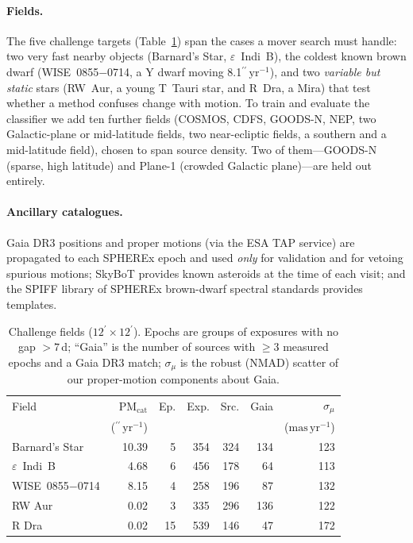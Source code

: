 \documentclass[10pt,twocolumn]{article}
\newcommand{\amin}{\ensuremath{^{\prime}}}
\newcommand{\asecyr}{\ensuremath{^{\prime\prime}\,\mathrm{yr}^{-1}}}
\newcommand{\masyr}{\ensuremath{\mathrm{mas\,yr}^{-1}}}
\newcommand{\epsIndiB}{$\varepsilon$~Indi~B}
\newcommand{\wise}{WISE~0855$-$0714}
\begin{document}
\paragraph{Fields.} The five challenge targets (Table~\ref{tab:fields}) span the cases a mover search must
handle: two very fast nearby objects (Barnard's Star, \epsIndiB), the coldest known brown dwarf
(\wise, a Y dwarf moving 8.1\asecyr), and two \emph{variable but static} stars (RW~Aur, a young T~Tauri
star, and R~Dra, a Mira) that test whether a method confuses change with motion. To train and evaluate the
classifier we add ten further fields (COSMOS, CDFS, GOODS-N, NEP, two Galactic-plane or mid-latitude
fields, two near-ecliptic fields, a southern and a mid-latitude field), chosen to span source density.
Two of them---GOODS-N (sparse, high latitude) and Plane-1 (crowded Galactic plane)---are held out entirely.

\paragraph{Ancillary catalogues.} Gaia DR3 \citep{gaia2023} positions and proper motions (via the ESA
TAP service) are propagated to each SPHEREx epoch and used \emph{only} for validation and for vetoing
spurious motions; SkyBoT \citep{berthier2006} provides known asteroids at the time of each visit; and the
SPIFF library of SPHEREx brown-dwarf spectral standards \citep{gagne2026} provides templates.

\begin{table}[t]
\centering
\caption{Challenge fields ($12\amin\times12\amin$). Epochs are groups of exposures with no gap
$>7$\,d; ``Gaia'' is the number of sources with $\geq3$ measured epochs and a Gaia DR3 match;
$\sigma_\mu$ is the robust (NMAD) scatter of our proper-motion components about Gaia.}
\label{tab:fields}
\small
\setlength{\tabcolsep}{2.4pt}
\begin{tabular}{@{}lrrrrrr@{}}
\toprule
Field & PM$_\mathrm{cat}$ & Ep. & Exp. & Src. & Gaia & $\sigma_\mu$ \\
      & (\asecyr) & & & & & (\masyr) \\
\midrule
Barnard's Star & 10.39 & 5 & 354 & 324 & 134 & 123 \\
\epsIndiB      & 4.68  & 6 & 456 & 178 & 64  & 113 \\
\wise          & 8.15  & 4 & 258 & 196 & 87  & 132 \\
RW Aur         & 0.02  & 3 & 335 & 296 & 136 & 122 \\
R Dra          & 0.02  & 15 & 539 & 146 & 47 & 172 \\
\bottomrule
\end{tabular}
\end{table}
\end{document}
